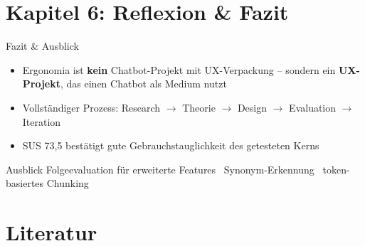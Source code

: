 \documentclass[14pt,aspectratio=169]{beamer}
\begin{document}
\section{Kapitel 6: Reflexion \& Fazit}

\begin{frame}{Fazit \& Ausblick}
    \begin{itemize}
        \item Ergonomia ist \textbf{kein} Chatbot-Projekt mit UX-Verpackung -- sondern ein \textbf{UX-Projekt}, das einen Chatbot als Medium nutzt
        \item Vollständiger Prozess: Research $\rightarrow$ Theorie $\rightarrow$ Design $\rightarrow$ Evaluation $\rightarrow$ Iteration
        \item SUS 73,5 bestätigt gute Gebrauchstauglichkeit des getesteten Kerns
    \end{itemize}
    \vspace{0.3cm}
    \begin{block}{Ausblick}
        Folgeevaluation für erweiterte Features \textbullet\ Synonym-Erkennung \textbullet\ token-basiertes Chunking
    \end{block}
\end{frame}

\section{Literatur}
\end{document}
